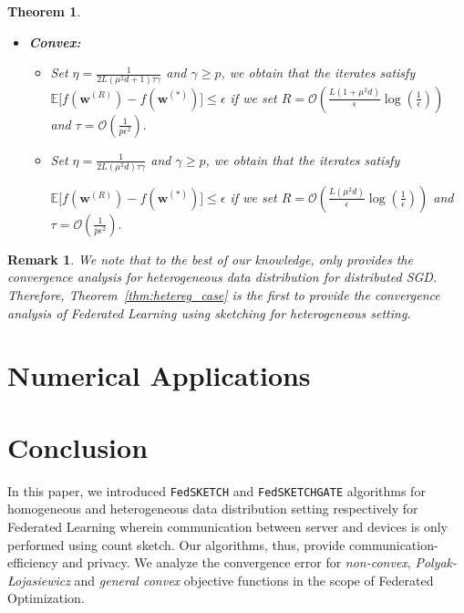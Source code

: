 \documentclass{article}
\newcommand{\pl}{Polyak-\L{}ojasiewicz}
\newtheorem{theorem}{Theorem}
\newtheorem{remark}{Remark}
\begin{document}
\begin{theorem}
\begin{itemize}
     \item \textbf{Convex:}
     \begin{itemize}
         \item [\texttt{PRIVIX}] Set $\eta=\frac{1}{2L\left(\mu^2d+1\right)\tau\gamma}$ and $\gamma\geq p$, we obtain that the iterates satisfy $ \mathbb{E}\Big[f({\boldsymbol{w}}^{(R)})-f({\boldsymbol{w}}^{(*)})\Big]\leq \epsilon$ if we set
     $R=\mathcal{O}\left(\frac{L\left(1+\mu^2d\right)}{\epsilon}\log\left(\frac{1}{\epsilon}\right)\right)$ and $ \tau=\mathcal{O}\left(\frac{1}{p\epsilon^2}\right).$
         \item [\texttt{HEAPRIX}] Set  $\eta=\frac{1}{2L\left(\mu^2d\right)\tau\gamma}$ and $\gamma\geq p$, we obtain that the iterates satisfy 
         
         $ \mathbb{E}\Big[f({\boldsymbol{w}}^{(R)})-f({\boldsymbol{w}}^{(*)})\Big]\leq \epsilon$ if we set
     $R=\mathcal{O}\left(\frac{L\left(\mu^2d\right)}{\epsilon}\log\left(\frac{1}{\epsilon}\right)\right)$ and $ \tau=\mathcal{O}\left(\frac{1}{p\epsilon^2}\right).$ 
     \end{itemize}
 \end{itemize}
\end{theorem}
\begin{remark}
We note that to the best of our knowledge, only \cite{li2019privacy} provides the convergence analysis for heterogeneous data distribution for distributed SGD. Therefore, Theorem~\ref{thm:hetereg_case} is the first to provide the convergence analysis of Federated Learning using sketching for heterogeneous setting.  
\end{remark}

\section{Numerical Applications}


\section{Conclusion}\label{sec:conclusion}
In this paper, we introduced \texttt{FedSKETCH} and \texttt{FedSKETCHGATE} algorithms for homogeneous and heterogeneous data distribution setting respectively for Federated Learning wherein communication between server and devices is only performed using count sketch. 
Our algorithms, thus, provide communication-efficiency and privacy. 
We analyze the convergence error for \emph{non-convex}, \emph{\pl} and \emph{general convex} objective functions in the scope of Federated Optimization.     
\end{document}
